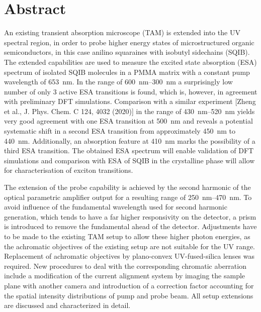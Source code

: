 \documentclass[twoside,openright,listof=numbered]{scrreprt}
\begin{document}
\chapter*{Abstract}
An existing transient absorption microscope (TAM) is extended into the UV spectral region, in order to probe higher energy states of microstructured organic semiconductors, in this case anilino squaraines with isobutyl sidechains (SQIB). The extended capabilities are used to measure the excited state absorption (ESA) spectrum of isolated SQIB molecules in a PMMA matrix with a constant pump wavelength of \qty{653}{\nano\meter}. In the range of \qtyrange{600}{300}{\nano\meter} a surprisingly low number of only 3 active ESA transitions is found, which is, however, in agreement with preliminary DFT simulations. 
Comparison with a similar experiment [Zheng et al., J. Phys. Chem. C 124, 4032 (2020)] in the range of \qtyrange{430}{520}{\nano\meter} yields very good agreement with one ESA transition at \qty{500}{\nano\meter} and reveals a potential systematic shift in a second ESA transition from approximately \qty{450}{\nano\meter} to \qty{440}{\nano\meter}. Additionally, an absorption feature at \qty{410}{\nano\meter} marks the possibility of a third ESA transition.
The obtained ESA spectrum will enable validation of DFT simulations and comparison with ESA of SQIB in the crystalline phase will allow for characterisation of exciton transitions.


The extension of the probe capability is achieved by the second harmonic of the optical parametric amplifier output for a resulting range of \SIrange{250}{470}{\nano\meter}. To avoid influence of the fundamental wavelength used for second harmonic generation, which tends to have a far higher responsivity on the detector, a prism is introduced to remove the fundamental ahead of the detector. Adjustments have to be made to the existing TAM setup to allow these higher photon energies, as the achromatic objectives of the existing setup are not suitable for the UV range. Replacement of achromatic objectives by plano-convex UV-fused-silica lenses was required. New procedures to deal with the corresponding chromatic aberration include a modification of the current alignment system by imaging the sample plane with another camera and introduction of a correction factor accounting for the spatial intensity distributions of pump and probe beam. All setup extensions are discussed and characterized in detail.
\end{document}
